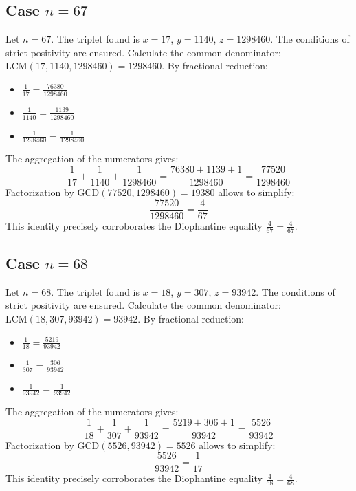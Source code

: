 \documentclass[11pt,a4paper]{article}
\begin{document}
\subsection{Case $n = 67$}
Let $n = 67$. The triplet found is $x = 17$, $y = 1140$, $z = 1298460$.
The conditions of strict positivity are ensured.
Calculate the common denominator: $\text{LCM}(17, 1140, 1298460) = 1298460$.
By fractional reduction:
\begin{itemize}
    \item $\frac{1}{17} = \frac{76380}{1298460}$
    \item $\frac{1}{1140} = \frac{1139}{1298460}$
    \item $\frac{1}{1298460} = \frac{1}{1298460}$
\end{itemize}
The aggregation of the numerators gives:
$$ \frac{1}{17} + \frac{1}{1140} + \frac{1}{1298460} = \frac{76380 + 1139 + 1}{1298460} = \frac{77520}{1298460} $$
Factorization by $\text{GCD}(77520, 1298460) = 19380$ allows to simplify:
$$ \frac{77520}{1298460} = \frac{4}{67} $$
This identity precisely corroborates the Diophantine equality $\frac{4}{67} = \frac{4}{67}$.

\subsection{Case $n = 68$}
Let $n = 68$. The triplet found is $x = 18$, $y = 307$, $z = 93942$.
The conditions of strict positivity are ensured.
Calculate the common denominator: $\text{LCM}(18, 307, 93942) = 93942$.
By fractional reduction:
\begin{itemize}
    \item $\frac{1}{18} = \frac{5219}{93942}$
    \item $\frac{1}{307} = \frac{306}{93942}$
    \item $\frac{1}{93942} = \frac{1}{93942}$
\end{itemize}
The aggregation of the numerators gives:
$$ \frac{1}{18} + \frac{1}{307} + \frac{1}{93942} = \frac{5219 + 306 + 1}{93942} = \frac{5526}{93942} $$
Factorization by $\text{GCD}(5526, 93942) = 5526$ allows to simplify:
$$ \frac{5526}{93942} = \frac{1}{17} $$
This identity precisely corroborates the Diophantine equality $\frac{4}{68} = \frac{4}{68}$.
\end{document}
